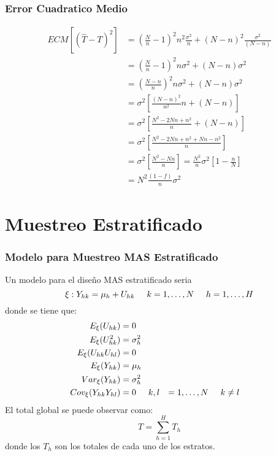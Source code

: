﻿\documentclass{beamer}
\begin{document}
\begin{frame}[allowframebreaks*]
\frametitle{Error Cuadratico Medio}
{\footnotesize
\begin{align*}
ECM[(\hat T-T)^2]&=\left(\frac{N}{n}-1\right)^2n^2\frac{\sigma^2}{n}+\left(N-n\right)^2\frac{\sigma^2}{(N-n)}\\
&=\left(\frac{N}{n}-1\right)^2n\sigma^2+\left(N-n\right)\sigma^2\\
&=\left(\frac{N-n}{n}\right)^2n\sigma^2+\left(N-n\right)\sigma^2\\
&=\sigma^2\left[\frac{(N-n)^2}{n^2}n+\left(N-n\right)\right]\\
&=\sigma^2\left[\frac{N^2-2Nn+n^2}{n}+\left(N-n\right)\right]\\
&=\sigma^2\left[\frac{N^2-2Nn+n^2+Nn-n^2}{n}\right]\\
&=\sigma^2\left[\frac{N^2-Nn}{n}\right]=\frac{N^2}{n}\sigma^2\left[1-\frac{n}{N}\right]\\
&=N^2\frac{(1-f)}{n}\sigma^2
\end{align*}}
\end{frame}

\section{Muestreo Estratificado}
 \tableofcontents[currentsection]

\begin{frame}[allowframebreaks*]
\frametitle{Modelo para Muestreo MAS Estratificado}
{\footnotesize
Un modelo para el dise\~no MAS estratificado seria
$$\xi: Y_{hk}=\mu_h+U_{hk}\hspace{0.5cm}k=1,\ldots,N\hspace{0.5cm}h=1,\ldots,H$$
donde se tiene que:
\begin{align*}
E_{\xi}(U_{hk})&=0\\
E_{\xi}(U_{hk}^2)&=\sigma_h^2\\
E_{\xi}(U_{hk}U_{hl})&=0\\
E_{\xi}(Y_{hk})&=\mu_h\\
Var_{\xi}(Y_{hk})&=\sigma_h^2\\
Cov_{\xi}(Y_{hk}Y_{hl})&=0 \hspace{.5cm} k,l&=1,\ldots,N \hspace{.5cm} k&\neq l
\end{align*}
El total global se puede observar como:
\begin{equation*}
T=\sum\limits_{h=1}^HT_h
\end{equation*}
donde los $T_h$ son los totales de cada uno de los estratos.}
\end{frame}
\end{document}

